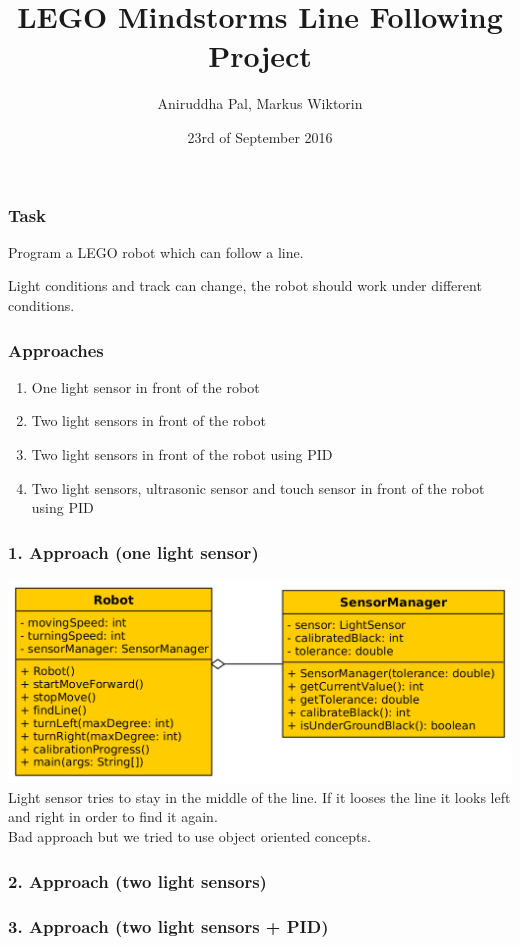 \documentclass{beamer}
\title{LEGO Mindstorms Line Following Project}
\author{Aniruddha Pal, Markus Wiktorin}
\date{23rd of September 2016}
\institute{University of Applied Science, Bonn-Rhein-Sieg}
\begin{document}
	\maketitle
	\begin{frame}
		\frametitle{Task}
		Program a LEGO robot which can follow a line.
		
		Light conditions and track can change, the robot should work under different conditions.
	\end{frame}
	\begin{frame}
		\frametitle{Approaches}
		\begin{enumerate}
			\item One light sensor in front of the robot
			\item Two light sensors in front of the robot
			\item Two light sensors in front of the robot using PID
			\item Two light sensors, ultrasonic sensor and touch sensor in front of the robot using PID
		\end{enumerate}
	\end{frame}
	\begin{frame}
		\frametitle{1. Approach (one light sensor)}
		\includegraphics[width=\textwidth, height=\textheight, keepaspectratio]{firstApproach.png}
		\\
		Light sensor tries to stay in the middle of the line. If it looses the line it looks left and right in order to find it again.
		\\
		Bad approach but we tried to use object oriented concepts.
	\end{frame}
	\begin{frame}
		\frametitle{2. Approach (two light sensors)}
		
	\end{frame}
	\begin{frame}
		\frametitle{3. Approach (two light sensors + PID)}
		
	\end{frame}
\end{document}
